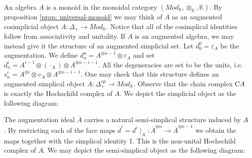 \documentclass[../thesis.tex]{subfiles}
\begin{document}
            An algebra $A$ is a monoid in the monoidal category $(Mod_\mathbb{K}, \otimes_\mathbb{K}, \mathbb{K})$. By proposition \ref{prop: universal-monoid} we may think of $A$ as an augmented cosimplicial object $A:\Delta_+ \rightarrow Mod_\mathbb{K}$. Notice that all of the cosimplical identities follow from associativity and unitality. If $A$ is an augmented algebra, we may instead give it the structure of an augmented simplicial set. Let $d^0_0 = \varepsilon_A$ be the augmentation. We define $d^n_n = A^{\otimes n-1}\otimes\varepsilon_A$ and set $d^i_n = A^{i-1}\otimes (\cdot_A) \otimes A^{\otimes n-i-1}$. All the degeneracies are set to be the units, i.e. $s^i_n = A^{\otimes i}\otimes \upsilon_A \otimes A^{\otimes n-i-1}$. One may check that this structure defines an augmented simplical object $A:\Delta_+^{op}\rightarrow Mod_\mathbb{K}$. Observe that the chain complex $\tt{C}A$ is exactly the Hochschild complex of $A$. We depict the simplicial object as the following diagram:
            \begin{center}

            \end{center}

            The augmentation ideal $\overline{A}$ carries a natural semi-simplical structure induced by $A$. By restricting each of the face maps ${\overline{d}}^i = d^i {\mid}_{\overline{A}}:\overline{A}^{\otimes n} \rightarrow \overline{A}^{\otimes n-1}$ we obtain the maps together with the simplical identity 1. This is the non-unital Hochschild complex of $A$. We may depict the semi-simplical object as the following diagram:
            \begin{center}
            \end{center}
\end{document}
